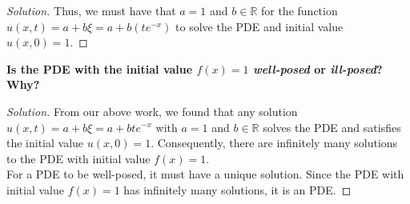 \documentclass[11pt]{article}
\newenvironment{solution}
  {\renewcommand\qedsymbol{$\blacksquare$}\begin{proof}[Solution]}
  {\end{proof}}
\begin{document}
\begin{enumerate}[(a)]
\begin{solution}
    Thus, we must have that $a = 1$ and $b \in \mathbb{R}$ for the function $u(x, t) = a+b\xi = a+b(te^{-x})$ to solve the PDE and initial value $u(x, 0) = 1.$ \end{solution}

    \textbf{Is the PDE with the initial value $f(x) = 1$ \textit{well-posed} or \textit{ill-posed}? Why?}
    \begin{solution} 

    From our above work, we found that any solution $u(x, t) = a + b\xi = a + bte^{-x}$ with $a = 1$ and $b \in \mathbb{R}$ solves the PDE and satisfies the initial value $u(x, 0) = 1.$ 
    Consequently, there are infinitely many solutions to the PDE with initial value $f(x) = 1.$ \\

    For a PDE to be well-posed, it must have a unique solution. Since the PDE with initial value $f(x) = 1$ has infinitely many solutions, it is an  PDE.
    \end{solution}
\end{enumerate}
\end{document}
